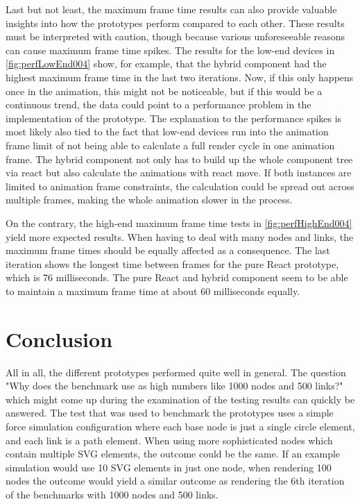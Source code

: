Last but not least, the maximum frame time results can also provide valuable insights into how the prototypes perform compared to each other. These results must be interpreted with caution, though because various unforeseeable reasons can cause maximum frame time spikes. The results for the low-end devices in \ref{fig:perfLowEnd004} show, for example, that the hybrid component had the highest maximum frame time in the last two iterations. Now, if this only happens once in the animation, this might not be noticeable, but if this would be a continuous trend, the data could point to a performance problem in the implementation of the prototype. The explanation to the performance spikes is most likely also tied to the fact that low-end devices run into the animation frame limit of not being able to calculate a full render cycle in one animation frame. The hybrid component not only has to build up the whole component tree via react but also calculate the animations with react move. If both instances are limited to animation frame constraints, the calculation could be spread out across multiple frames, making the whole animation slower in the process.

On the contrary, the high-end maximum frame time tests in \ref{fig:perfHighEnd004} yield more expected results. When having to deal with many nodes and links, the maximum frame times should be equally affected as a consequence. The last iteration shows the longest time between frames for the pure React prototype, which is 76 milliseconds. The pure React and hybrid component seem to be able to maintain a maximum frame time at about 60 milliseconds equally.


\section{Conclusion}

All in all, the different prototypes performed quite well in general. The question "Why does the benchmark use as high numbers like 1000 nodes and 500 links?" which might come up during the examination of the testing results can quickly be answered. The test that was used to benchmark the prototypes uses a simple force simulation configuration where each base node is just a single circle element, and each link is a path element. When using more sophisticated nodes which contain multiple SVG elements, the outcome could be the same. If an example simulation would use 10 SVG elements in just one node, when rendering 100 nodes the outcome would yield a similar outcome as rendering the 6th iteration of the benchmarks with 1000 nodes and 500 links.

